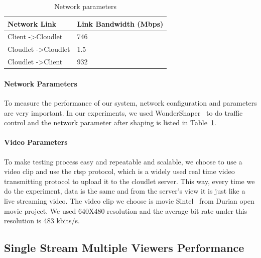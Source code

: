 \documentclass[letterpaper,twocolumn,10pt]{article}
\begin{document}
\begin{table}[h]
\begin{tabular}{|l|l|}
\hline
Network Link & Link Bandwidth (Mbps) \\ \hline
Client -\textgreater Cloudlet & 746 \\ \hline
Cloudlet -\textgreater Cloudlet & 1.5 \\ \hline
Cloudlet -\textgreater Client & 932 \\ \hline
\end{tabular}
\caption{Network parameters}
\label{table:network}
\end{table}

\paragraph{Network Parameters}
To measure the performance of our system, network configuration and parameters are very important. In our experiments, we used WonderShaper~\cite{wondershaper} to do traffic control and the network parameter after shaping is listed in Table~\ref{table:network}.

\paragraph{Video Parameters}
To make testing process easy and repeatable and scalable, we choose to use a video clip and use the rtsp protocol, which is a widely used real time video transmitting protocol to upload it to the cloudlet server. This way, every time we do the experiment, data is the same and from the server's view it is just like a live streaming video. The video clip we choose is movie Sintel~\cite{sintel} from Durian open movie project. We used 640X480 resolution and the average bit rate under this resolution is 483 kbits/s.

\subsection{Single Stream Multiple Viewers Performance}
\end{document}
